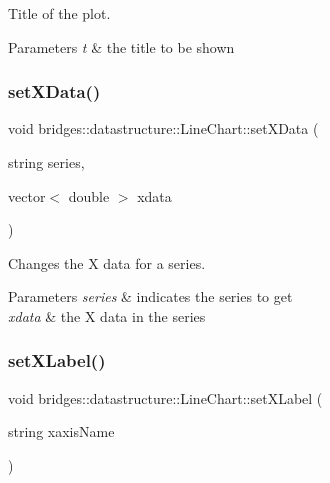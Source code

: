 Title of the plot. 


\begin{DoxyParams}{Parameters}
{\em t} & the title to be shown \\
\hline
\end{DoxyParams}
\mbox{\label{classbridges_1_1datastructure_1_1_line_chart_aa9959489d71e31645f561c4481f050d2}} 
\subsubsection{\texorpdfstring{set\+X\+Data()}{setXData()}}
{\footnotesize\ttfamily void bridges\+::datastructure\+::\+Line\+Chart\+::set\+X\+Data (\begin{DoxyParamCaption}\item[{string}]{series,  }\item[{vector$<$ double $>$}]{xdata }\end{DoxyParamCaption})\hspace{0.3cm}{\ttfamily [inline]}}



Changes the X data for a series. 


\begin{DoxyParams}{Parameters}
{\em series} & indicates the series to get \\
\hline
{\em xdata} & the X data in the series \\
\hline
\end{DoxyParams}
\mbox{\label{classbridges_1_1datastructure_1_1_line_chart_ab31677353448c66017eb93bf61c087ce}} 
\subsubsection{\texorpdfstring{set\+X\+Label()}{setXLabel()}}
{\footnotesize\ttfamily void bridges\+::datastructure\+::\+Line\+Chart\+::set\+X\+Label (\begin{DoxyParamCaption}\item[{string}]{xaxis\+Name }\end{DoxyParamCaption})\hspace{0.3cm}{\ttfamily [inline]}}



